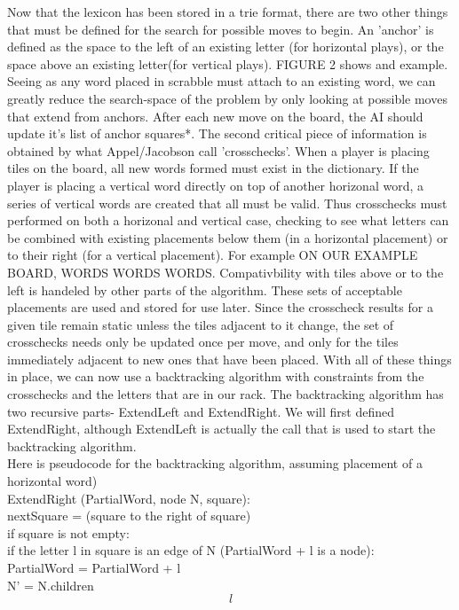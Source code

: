 \documentclass[12pt]{article}
\begin{document}
{	Now that the lexicon has been stored in a trie format, there are two other things that must be defined for the search for possible moves to begin. An 'anchor' is defined as the space to the left of an existing letter (for horizontal plays), or the space above an existing letter(for vertical plays). FIGURE 2 shows and example. Seeing as any word placed in scrabble must attach to an existing word, we can greatly reduce the search-space of the problem by only looking at possible moves that extend from anchors. After each new move on the board, the AI should update it's list of anchor squares*. The second critical piece of information is obtained by what Appel/Jacobson call 'crosschecks'. When a player is placing tiles on the board, all new words formed must exist in the dictionary. If the player is placing a vertical word directly on top of another horizonal word, a series of vertical words are created that all must be valid. Thus crosschecks must performed on both a horizonal and vertical case, checking to see what letters can be combined with existing placements below them (in a horizontal placement) or to their right (for a vertical placement). For example ON OUR EXAMPLE BOARD, WORDS WORDS WORDS. Compativbility with tiles above or to the left is handeled by other parts of the algorithm. These sets of acceptable placements are used and stored for use later. Since the crosscheck results for a given tile remain static unless the tiles adjacent to it change, the set of crosschecks needs only be updated once per move, and only for the tiles immediately adjacent to new ones that have been placed. 
	With all of these things in place, we can now use a backtracking algorithm with constraints from the crosschecks and the letters that are in our rack. The backtracking algorithm has two recursive parts- ExtendLeft and ExtendRight. We will first defined ExtendRight, although ExtendLeft is actually the call that is used to start the backtracking algorithm. \\ 
Here is pseudocode for the backtracking algorithm, assuming placement of a horizontal word)\\
	ExtendRight (PartialWord, node N, square):\\
		nextSquare = (square to the right of square)\\
		if square is not empty:\\
			if the letter l in square is an edge of N (PartialWord + l is a node):\\
				PartialWord  = PartialWord + l\\
				N' = N.children\[l\]\\
}
\end{document}
